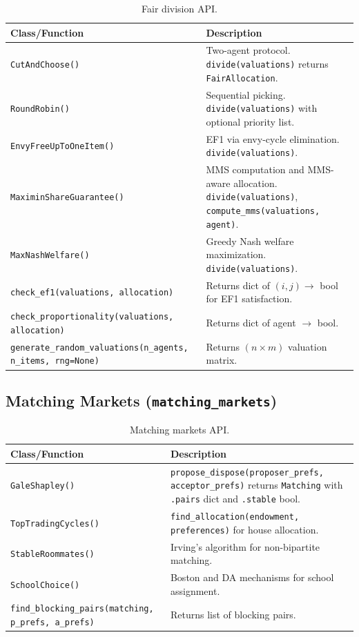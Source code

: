 \documentclass[10pt]{article}
\begin{document}
\begin{table}[H]
\centering
\caption{Fair division API.}
\label{tab:api-fd}
\begin{tabularx}{\textwidth}{lX}
\toprule
\textbf{Class/Function} & \textbf{Description} \\
\midrule
\texttt{CutAndChoose()} & Two-agent protocol. \texttt{divide(valuations)} returns \texttt{FairAllocation}. \\
\texttt{RoundRobin()} & Sequential picking. \texttt{divide(valuations)} with optional priority list. \\
\texttt{EnvyFreeUpToOneItem()} & EF1 via envy-cycle elimination. \texttt{divide(valuations)}. \\
\texttt{MaximinShareGuarantee()} & MMS computation and MMS-aware allocation. \texttt{divide(valuations)}, \texttt{compute\_mms(valuations, agent)}. \\
\texttt{MaxNashWelfare()} & Greedy Nash welfare maximization. \texttt{divide(valuations)}. \\
\texttt{check\_ef1(valuations, allocation)} & Returns dict of $(i,j) \to$ bool for EF1 satisfaction. \\
\texttt{check\_proportionality(valuations, allocation)} & Returns dict of agent $\to$ bool. \\
\texttt{generate\_random\_valuations(n\_agents, n\_items, rng=None)} & Returns $(n \times m)$ valuation matrix. \\
\bottomrule
\end{tabularx}
\end{table}

\subsection{Matching Markets (\texttt{matching\_markets})}

\begin{table}[H]
\centering
\caption{Matching markets API.}
\label{tab:api-match}
\begin{tabularx}{\textwidth}{lX}
\toprule
\textbf{Class/Function} & \textbf{Description} \\
\midrule
\texttt{GaleShapley()} & \texttt{propose\_dispose(proposer\_prefs, acceptor\_prefs)} returns \texttt{Matching} with \texttt{.pairs} dict and \texttt{.stable} bool. \\
\texttt{TopTradingCycles()} & \texttt{find\_allocation(endowment, preferences)} for house allocation. \\
\texttt{StableRoommates()} & Irving's algorithm for non-bipartite matching. \\
\texttt{SchoolChoice()} & Boston and DA mechanisms for school assignment. \\
\texttt{find\_blocking\_pairs(matching, p\_prefs, a\_prefs)} & Returns list of blocking pairs. \\
\bottomrule
\end{tabularx}
\end{table}
\end{document}
